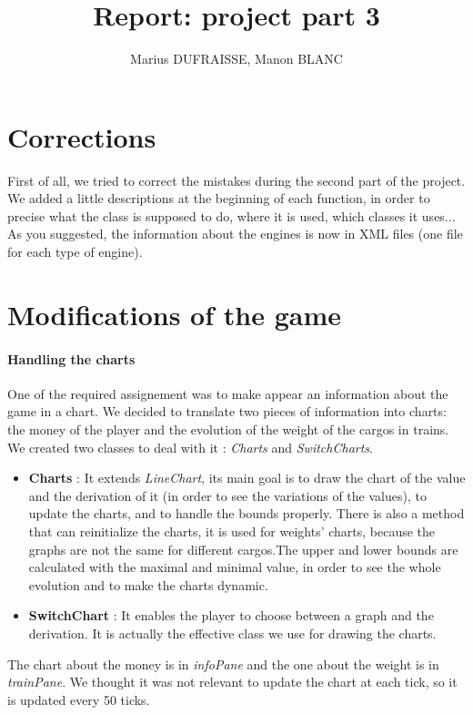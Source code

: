\documentclass[a4paper]{article}
\title{Report: project part 3}
\author{Marius DUFRAISSE, Manon BLANC}
\date{  }
\begin{document}
	\maketitle
	\thispagestyle{fancy}
	\section{Corrections}
	
	First of all, we tried to correct the mistakes during the second part of the project. We added a little descriptions at the beginning of each function, in order to precise what the class is supposed to do, where it is used, which classes it uses... As you suggested, the information about the engines is now in XML files (one file for each type of engine).
	
	\section{Modifications of the game}
	
	\paragraph{Handling the charts} 
	One of the required assignement was to make appear an information about the game in a chart. We decided to translate two pieces of information into charts: the money of the player and the evolution of the weight of the cargos in trains. We created two classes to deal with it : \textit{Charts} and \textit{SwitchCharts}. 
	\begin{itemize}
		\item \textbf{Charts }: It extends \textit{LineChart}, its main goal is to draw the chart of the value and the derivation of it (in order to see the variations of the values), to update the charts, and to handle the bounds properly. There is also a method that can reinitialize the charts, it is used for weights' charts, because the graphs are not the same for different cargos.The upper and lower bounds are calculated with the maximal and minimal value, in order to see the whole evolution and to make the charts dynamic. 
		\item \textbf{SwitchChart} : It enables the player to choose between a graph and the derivation. It is actually the effective class we use for drawing the charts.
	\end{itemize} 
	The chart about the money is in \textit{infoPane} and the one about the weight is in \textit{trainPane}. We thought it was not relevant to update the chart at each tick, so it is updated every 50 ticks.
\end{document}
